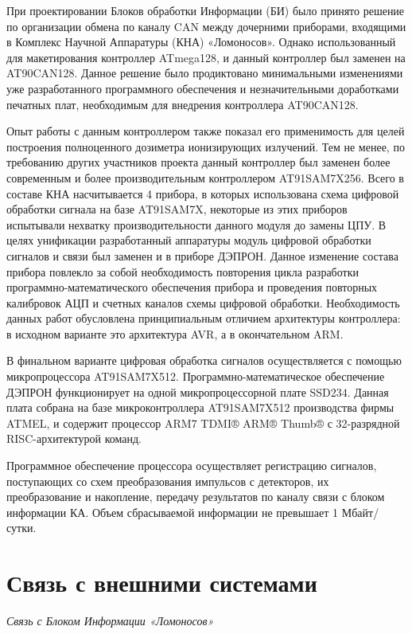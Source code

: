 
При проектировании Блоков обработки Информации (БИ) было принято решение по организации обмена по каналу CAN между дочерними приборами, входящими в Комплекс Научной Аппаратуры (КНА) «Ломоносов». Однако использованный для макетирования контроллер ATmega128, и данный контроллер был заменен на AT90CAN128. Данное решение было продиктовано минимальными изменениями уже разработанного программного обеспечения и незначительными доработками печатных плат, необходимым для внедрения контроллера AT90CAN128.

Опыт работы с данным контроллером также показал его применимость для целей построения полноценного дозиметра ионизирующих излучений. Тем не менее, по требованию других участников проекта данный контроллер был заменен более современным и более производительным контроллером AT91SAM7X256. Всего в составе КНА насчитывается 4 прибора, в которых использована схема цифровой обработки сигнала на базе AT91SAM7X, некоторые из этих приборов испытывали нехватку производительности данного модуля до замены ЦПУ. В целях унификации разработанный аппаратуры модуль цифровой обработки сигналов и связи был заменен и в приборе ДЭПРОН. Данное изменение состава прибора повлекло за собой необходимость повторения цикла разработки программно-математического обеспечения прибора и проведения повторных калибровок АЦП и счетных каналов схемы цифровой обработки. Необходимость данных работ обусловлена принципиальным отличием архитектуры контроллера: в исходном варианте это архитектура AVR, а в окончательном ARM. 

В финальном варианте цифровая обработка сигналов осуществляется с помощью микропроцессора AT91SAM7X512. Программно-математическое обеспечение ДЭПРОН функционирует на одной микропроцессорной плате SSD234. Данная плата собрана на базе микроконтроллера AT91SAM7X512 производства фирмы ATMEL, и содержит процессор ARM7 TDMI® ARM® Thumb® с 32-разрядной RISC-архитектурой команд.

Программное обеспечение процессора осуществляет регистрацию сигналов, поступающих со схем преобразования импульсов с детекторов, их преобразование и накопление, передачу результатов по каналу связи с блоком информации КА. Объем сбрасываемой информации не превышает 1 Мбайт/сутки.

\section{Связь с внешними системами}
\emph{Связь с Блоком Информации «Ломоносов»}

